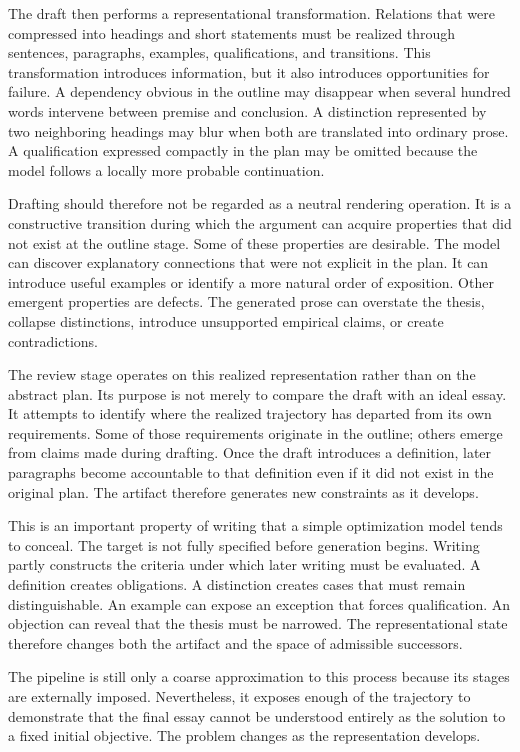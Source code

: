 \documentclass[11pt]{article}
\begin{document}
The draft then performs a representational transformation. Relations that were compressed into headings and short statements must be realized through sentences, paragraphs, examples, qualifications, and transitions. This transformation introduces information, but it also introduces opportunities for failure. A dependency obvious in the outline may disappear when several hundred words intervene between premise and conclusion. A distinction represented by two neighboring headings may blur when both are translated into ordinary prose. A qualification expressed compactly in the plan may be omitted because the model follows a locally more probable continuation.

Drafting should therefore not be regarded as a neutral rendering operation. It is a constructive transition during which the argument can acquire properties that did not exist at the outline stage. Some of these properties are desirable. The model can discover explanatory connections that were not explicit in the plan. It can introduce useful examples or identify a more natural order of exposition. Other emergent properties are defects. The generated prose can overstate the thesis, collapse distinctions, introduce unsupported empirical claims, or create contradictions.

The review stage operates on this realized representation rather than on the abstract plan. Its purpose is not merely to compare the draft with an ideal essay. It attempts to identify where the realized trajectory has departed from its own requirements. Some of those requirements originate in the outline; others emerge from claims made during drafting. Once the draft introduces a definition, later paragraphs become accountable to that definition even if it did not exist in the original plan. The artifact therefore generates new constraints as it develops.

This is an important property of writing that a simple optimization model tends to conceal. The target is not fully specified before generation begins. Writing partly constructs the criteria under which later writing must be evaluated. A definition creates obligations. A distinction creates cases that must remain distinguishable. An example can expose an exception that forces qualification. An objection can reveal that the thesis must be narrowed. The representational state therefore changes both the artifact and the space of admissible successors.

The pipeline is still only a coarse approximation to this process because its stages are externally imposed. Nevertheless, it exposes enough of the trajectory to demonstrate that the final essay cannot be understood entirely as the solution to a fixed initial objective. The problem changes as the representation develops.
\end{document}
